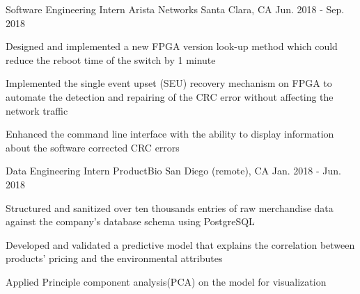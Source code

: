 

\begin{cventries}

  \cventry
    {Software Engineering Intern} %
    {Arista Networks} %
    {Santa Clara, CA} %
    {Jun. 2018 - Sep. 2018} %
    {
      \begin{cvitems} %
        \item {Designed and implemented a new FPGA version look-up method which could reduce the reboot time of the switch by 1 minute}
        \item {Implemented the single event upset (SEU) recovery mechanism on FPGA to automate the detection and repairing of the CRC error without affecting the network traffic}
        \item {Enhanced the command line interface with the ability to display information about the software corrected CRC errors}
      \end{cvitems}
    }

  \cventry
    {Data Engineering Intern} %
    {ProductBio} %
    {San Diego (remote), CA} %
    {Jan. 2018 - Jun. 2018} %
    {
      \begin{cvitems} %
        \item {Structured and sanitized over ten thousands entries of raw merchandise data against the company's database schema using PostgreSQL}
        \item {Developed and validated a predictive model that explains the correlation between products' pricing and the environmental attributes}
        \item {Applied Principle component analysis(PCA) on the model for visualization}
      \end{cvitems}
    }
    

\end{cventries}
